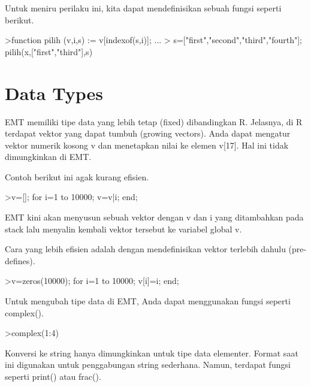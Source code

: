 \documentclass{article}
\newenvironment{eulernotebook}{\par}{\par}
\newcommand{\eulerheading}[1]{\section{#1}}
\newenvironment{eulercomment}{\par\medskip}{\par\medskip}
\begin{document}
\begin{eulernotebook}
\begin{eulercomment}
\begin{eulercomment}
\begin{eulercomment}
\begin{eulercomment}
\begin{eulercomment}
Untuk meniru perilaku ini, kita dapat mendefinisikan sebuah fungsi
seperti berikut.
\end{eulercomment}
\begin{eulerprompt}
>function pilih (v,i,s) := v[indexof(s,i)]; ...
> s=["first","second","third","fourth"]; pilih(x,["first","third"],s)
\end{eulerprompt}
\begin{euleroutput}
  [10.4,  3.1]
\end{euleroutput}
\eulerheading{Data Types}
\begin{eulercomment}
EMT memiliki tipe data yang lebih tetap (fixed) dibandingkan R.
Jelasnya, di R terdapat vektor yang dapat tumbuh (growing vectors).
Anda dapat mengatur vektor numerik kosong v dan menetapkan nilai ke
elemen v[17]. Hal ini tidak dimungkinkan di EMT.

Contoh berikut ini agak kurang efisien.
\end{eulercomment}
\begin{eulerprompt}
>v=[]; for i=1 to 10000; v=v|i; end;
\end{eulerprompt}
\begin{eulercomment}
EMT kini akan menyusun sebuah vektor dengan v dan i yang ditambahkan
pada stack lalu menyalin kembali vektor tersebut ke variabel global v.

Cara yang lebih efisien adalah dengan mendefinisikan vektor terlebih
dahulu (pre-defines).
\end{eulercomment}
\begin{eulerprompt}
>v=zeros(10000); for i=1 to 10000; v[i]=i; end;
\end{eulerprompt}
\begin{eulercomment}
Untuk mengubah tipe data di EMT, Anda dapat menggunakan fungsi seperti
complex().
\end{eulercomment}
\begin{eulerprompt}
>complex(1:4)
\end{eulerprompt}
\begin{euleroutput}
  [ 1+0i ,  2+0i ,  3+0i ,  4+0i  ]
\end{euleroutput}
\begin{eulercomment}
Konversi ke string hanya dimungkinkan untuk tipe data elementer.
Format saat ini digunakan untuk penggabungan string sederhana. Namun,
terdapat fungsi seperti print() atau frac().


\end{eulercomment}
\end{eulercomment}
\end{eulercomment}
\end{eulercomment}
\end{eulercomment}
\end{eulernotebook}
\end{document}
